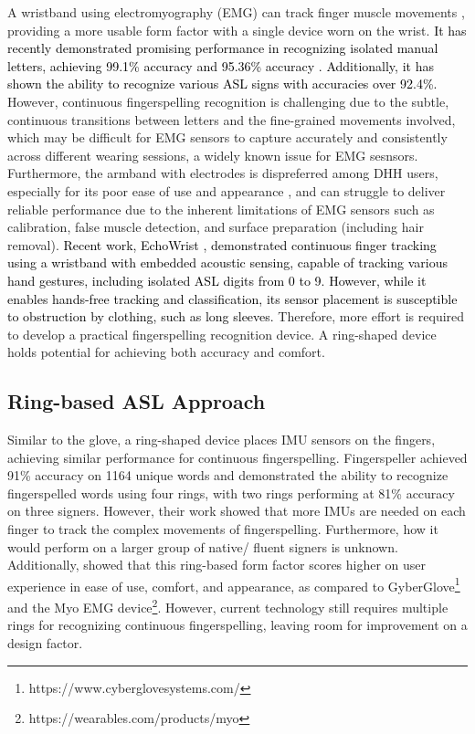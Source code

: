 A wristband using electromyography (EMG) can track finger muscle movements \cite{singh2023reliable}, providing a more usable form factor with a single device worn on the wrist. \textcolor{black}{It has recently demonstrated promising performance in recognizing isolated manual letters, achieving 99.1\% accuracy \cite{singh2023reliable} and 95.36\% accuracy \cite{paudyal2017dyfav}. Additionally, it has shown the ability to recognize various ASL signs \cite{zhang2019myosign, abreu2016evaluating} with accuracies over 92.4\%.} However, continuous fingerspelling recognition is challenging due to the subtle, continuous transitions between letters and the fine-grained movements involved, which may be difficult for EMG sensors to capture accurately and consistently across different wearing sessions, a widely known issue for EMG sesnsors.  Furthermore, the armband with electrodes is dispreferred among DHH users, especially for its poor ease of use and appearance \cite{zhou2023signquery}, and can struggle to deliver reliable performance due to the inherent limitations of EMG sensors \cite{kudrinko2020wearable, ben2023sign} such as calibration, false muscle detection, and surface preparation (including hair removal). \textcolor{black}{Recent work, EchoWrist \cite{lee2024echowrist}, demonstrated continuous finger tracking using a wristband with embedded acoustic sensing, capable of tracking various hand gestures, including isolated ASL digits from 0 to 9. However, while it enables hands-free tracking and classification, its sensor placement is susceptible to obstruction by clothing, such as long sleeves.} Therefore, more effort is required to develop a practical fingerspelling recognition device. A ring-shaped device holds potential for achieving both accuracy and comfort. 

\subsection{Ring-based ASL Approach}
 Similar to the glove, a ring-shaped device places IMU sensors on the fingers, achieving similar performance for continuous fingerspelling. Fingerspeller \cite{martin2023fingerspeller} achieved 91\% accuracy on 1164 unique words and demonstrated the ability to recognize fingerspelled words using four rings, with two rings performing at 81\% accuracy on three signers. However, their work \cite{martin2023fingerspeller} showed that more IMUs are needed on each finger to track the complex movements of fingerspelling. Furthermore, how it would perform on a larger group of native/ fluent signers is unknown. Additionally, \cite{zhou2023signquery} showed that this ring-based form factor scores higher on user experience in ease of use, comfort, and appearance, as compared to GyberGlove\footnote{https://www.cyberglovesystems.com/} and the Myo EMG device\footnote{https://wearables.com/products/myo}. However, current technology still requires multiple rings for recognizing continuous fingerspelling, leaving room for improvement on a design factor. 


